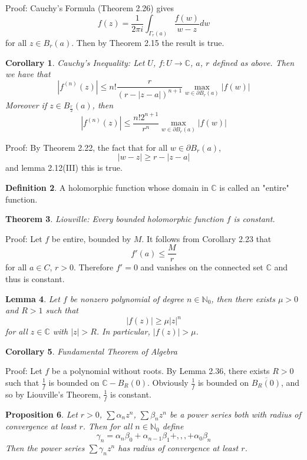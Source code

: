 \documentclass[11pt]{article}
\theoremstyle{plain}
\newtheorem{theorem}{Theorem}[section]
\newtheorem{corollary}[theorem]{Corollary}
\newtheorem{lemma}[theorem]{Lemma}
\newtheorem{proposition}[theorem]{Proposition}
\theoremstyle{definition}
\newtheorem{definition}[theorem]{Definition}
\newcommand{\C}{\mathbb{C}}
\begin{document}
Proof: Cauchy's Formula (Theorem 2.26) gives 
$$ f(z) = \frac{1}{2\pi i} \int_{\Gamma_r(a)} \frac{f(w)}{w-z} dw $$
for all $z \in B_r(a)$. Then by Theorem 2.15 the result is true. 

\begin{corollary}
Cauchy's Inequality: Let $U$, $f: U \to \C$, $a$, $r$ defined as above. Then we have that 
$$ |f^{(n)}(z)| \leq n! \frac{r}{(r - |z - a|)^{n+1}} \max_{w \in \partial B_r(a)} |f(w)| $$
Moreover if $z \in B_{\frac{r}{2}}(a)$, then 
$$ |f^{(n)}(z)| \leq \frac{n!2^{n+1}}{r^n} \max_{w \in \partial B_r(a)} |f(w)| $$
\end{corollary}

Proof: By Theorem 2.22, the fact that for all $w\in\partial B_r(a)$, 
$$|w - z| \geq r - |z - a|$$
 and lemma 2.12(III) this is true.
 
 \begin{definition}
 A holomorphic function whose domain in $\C$ is called an "entire" function.
 \end{definition}
 
 \begin{theorem}
 Liouville: Every bounded holomorphic function $f$ is constant.
 \end{theorem}
 
 Proof: Let $f$ be entire, bounded by $M$. It follows from Corollary 2.23 that 
 $$ f'(a) \leq \frac{M}{r} $$
 for all $a \in C$, $r > 0$. Therefore $f' = 0$ and vanishes on the connected set $\C$ and thus is constant.
 
 \begin{lemma}
 Let $f$ be nonzero polynomial of degree $n \in \mathbb{N}_0$, then there exists $\mu > 0$ and $R > 1$ such that 
 $$ |f(z)| \geq \mu |z|^n $$
 for all $z \in \C$ with $|z| > R$. In particular, $|f(z)| > \mu$.
 \end{lemma}
 
 \begin{corollary}
 Fundamental Theorem of Algebra
 \end{corollary}
 
 Proof: Let $f$ be a polynomial without roots. By Lemma 2.36, there exists $R > 0$ such that $\frac{1}{f}$ is bounded on $\C - B_R(0)$. Obviously $\frac{1}{f}$ is bounded on $\overline{B_R(0)}$, and so by Liouville's Theorem, $\frac{1}{f}$ is constant.
 
 \begin{proposition}
 Let $r > 0$, $\sum \alpha_n z^n$, $\sum \beta_n z^n$ be a power series both with radius of convergence at least $r$. Then for all $n \in \mathbb{N}_0$ define 
 $$ \gamma_n = \alpha_n\beta_0 + \alpha_{n-1}\beta_1 + ,,, + \alpha_0\beta_n$$
 Then the power series $\sum \gamma_n z^n$ has radius of convergence at least $r$.
 \end{proposition}
 
\end{document}
